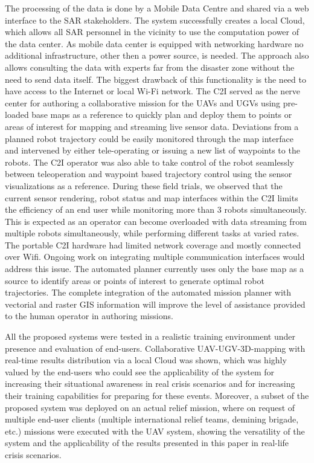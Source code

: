 \documentclass{article}
\begin{document}
	
The processing of the data is done by a Mobile Data Centre and shared via a web interface to the SAR stakeholders.
The system successfully creates a local Cloud, which allows all SAR personnel in the vicinity to use the computation power of the data center.
As mobile data center is equipped with networking hardware no additional infrastructure, other then a power source, is needed.
The approach also allows consulting the data with experts far from the disaster zone without the need to send data itself.
The biggest drawback of this functionality is the need to have access to the Internet or local Wi-Fi network.
The C2I served as the nerve center for authoring a collaborative mission for the UAVs and UGVs using pre-loaded base maps as a reference to quickly plan and deploy them to points or areas of interest for mapping and streaming live sensor data.
Deviations from a planned robot trajectory could be easily monitored through the map interface and intervened by either tele-operating or issuing a new list of waypoints to the robots.
The C2I operator was also able to take control of the robot seamlessly between teleoperation and waypoint based trajectory control using the sensor visualizations as a reference.
During these field trials, we observed that the current sensor rendering, robot status and map interfaces within the C2I limits the efficiency of an end user while monitoring more than 3 robots simultaneously.
This is expected as an operator can become overloaded with data streaming from multiple robots simultaneously, while performing different tasks at varied rates.
The portable C2I hardware had limited network coverage and mostly connected over Wifi.
Ongoing work on integrating multiple communication interfaces would address this issue.
The automated planner currently uses only the base map as a source to identify areas or points of interest to generate optimal robot trajectories.
The complete integration of the automated mission planner with vectorial and raster GIS information will improve the level of assistance provided to the human operator in authoring missions.
	
	
All the proposed systems were tested in a realistic training environment under presence and evaluation of end-users. Collaborative UAV-UGV-3D-mapping with real-time results distribution via a local Cloud was shown, which was highly valued by the end-users who could see the applicability of the system for increasing their situational awareness in real crisis scenarios and for increasing their training capabilities for preparing for these events.
Moreover, a subset of the proposed system was deployed on an actual relief mission, where on request of multiple end-user clients (multiple international relief teams, demining brigade, etc.) missions were executed with the UAV system, showing the versatility of the system and the applicability of the results presented in this paper in real-life crisis scenarios.
	
\end{document}
